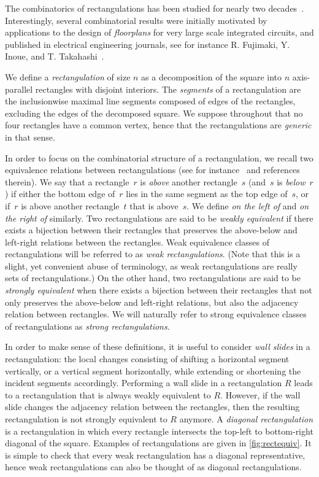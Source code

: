 \documentclass{amsart}
\theoremstyle{definition}
\newcommand{\darkblue}{\color{darkblue}} %
\newcommand{\defn}[1]{\textsl{\darkblue #1}} %
\begin{document}
The combinatorics of rectangulations has been studied for nearly two decades~\cite{MR2233287,MR2763051,MR2871762,MR2864445,MR3084577,MR3192492,MR3878132,MR4598046}.
Interestingly, several combinatorial results were initially motivated by applications to the design of \defn{floorplans} for very large scale integrated circuits, and published in electrical engineering journals, see for instance R. Fujimaki, Y. Inoue, and T. Takahashi~\cite{FT07,TF08,ITF09,FIT09}.

We define a \defn{rectangulation} of size $n$ as a decomposition of the square into $n$ axis-parallel rectangles with disjoint interiors.
The \defn{segments} of a rectangulation are the inclusionwise maximal line segments composed of edges of the rectangles, excluding the edges of the decomposed square.
We suppose throughout that no four rectangles have a common vertex, hence that the rectangulations are \defn{generic} in that sense.

In order to focus on the combinatorial structure of a rectangulation, we recall two equivalence relations between rectangulations (see for instance~\cite{ACFF24} and references therein).
We say that a rectangle~$r$ is \defn{above} another rectangle~$s$ (and~$s$ is \defn{below}~$r$) if either the bottom edge of~$r$ lies in the same segment as the top edge of~$s$, or if~$r$ is above another rectangle~$t$ that is above~$s$.
We define \defn{on the left of} and \defn{on the right of} similarly.
Two rectangulations are said to be \defn{weakly equivalent} if there exists a bijection between their rectangles that preserves the above-below and left-right relations between the rectangles.
Weak equivalence classes of rectangulations will be referred to as \defn{weak rectangulations}.
(Note that this is a slight, yet convenient abuse of terminology, as weak rectangulations are really sets of rectangulations.)
On the other hand, two rectangulations are said to be \defn{strongly equivalent} when there exists a bijection between their rectangles that not only preserves the above-below and left-right relations, but also the adjacency relation between rectangles.
We will naturally refer to strong equivalence classes of rectangulations as \defn{strong rectangulations}.

In order to make sense of these definitions, it is useful to consider \defn{wall slides} in a rectangulation: the local changes consisting of shifting a horizontal segment vertically, or a vertical segment horizontally, while extending or shortening the incident segments accordingly.
Performing a wall slide in a rectangulation $R$ leads to a rectangulation that is always weakly equivalent to $R$.
However, if the wall slide changes the adjacency relation between the rectangles, then the resulting rectangulation is not strongly equivalent to $R$ anymore.
A \defn{diagonal rectangulation} is a rectangulation in which every rectangle intersects the top-left to bottom-right diagonal of the square.
Examples of rectangulations are given in \cref{fig:rectequiv}.
It is simple to check that every weak rectangulation has a diagonal representative, hence weak rectangulations can also be thought of as diagonal rectangulations.
\end{document}
